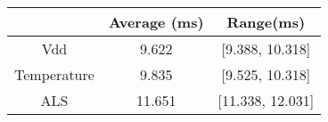 \begin{tabular}{|c|c|c|}
	\hline
	& Average (ms) & Range(ms) \\ 
	\hline
	Vdd & 9.622 & [9.388, 10.318] \\ 
	\hline
	Temperature & 9.835 & [9.525, 10.318] \\ 
	\hline
	ALS & 11.651 & [11.338, 12.031] \\
	\hline
\end{tabular} 
